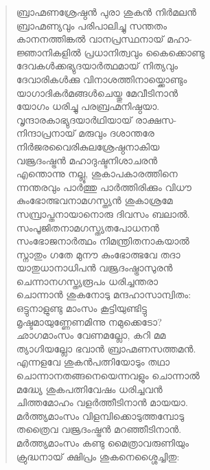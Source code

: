 \begin{verse}
ബ്രാഹ്മണശ്രേഷ്ഠന്‍ പുരാ ശുകന്‍ നിര്‍മലന്‍\\
ബ്രാഹ്മണ്യവും പരിപാലിച്ചു സന്തതം\\
കാനനത്തിങ്കല്‍ വാനപ്രസ്ഥനായ് മഹാ-\\
ജ്ഞാനികളില്‍ പ്രധാനിത്വവും കൈക്കൊണ്ടു\\
ദേവകള്‍ക്കഭ്യുദയാര്‍ത്ഥമായ് നിത്യവും\\
ദേവാരികള്‍ക്കു വിനാശത്തിനായ്ക്കൊണ്ടും\\
യാഗാദികര്‍മങ്ങള്‍ചെയ്തു മേവീടിനാന്‍\\
യോഗം ധരിച്ചു പരബ്രഹ്മനിഷ്ഠയാ.\\
വൃന്ദാരകാഭ്യുദയാര്‍ഥിയായ് രാക്ഷസ-\\
നിന്ദാപ്രനായ് മരുവും ദശാന്തരേ\\
നിര്‍ജരവൈരികുലശ്രേഷ്ഠനാകിയ\\
വജ്രദംഷ്ട്രന്‍ മഹാദുഷ്ടനിശാചരന്‍\\
എന്തൊന്നു നല്ലൂ, ശുകാപകാരത്തിനെ\\
ന്നന്തരവും പാര്‍ത്തു പാര്‍ത്തിരിക്കും വിധൗ\\
കുംഭോത്ഭവനാമഗസ്ത്യന്‍ ശുകാശ്രമേ\\
സമ്പ്രാപ്തനായാനൊരു ദിവസം ബലാല്‍.\\
സംപൂജിതനാമഗസ്ത്യതപോധനന്‍\\
സംഭോജനാര്‍ത്ഥം നിമന്ത്രിതനാകയാല്‍\\
സ്നാതും ഗതേ മുനൗ കുംഭോത്ഭവേ തദാ\\
യാതുധാനാധിപന്‍ വജ്രദംഷ്ട്രാസുരന്‍\\
ചെന്നാനഗസ്ത്യരൂപം ധരിച്ചന്തരാ\\
ചൊന്നാന്‍ ശുകനോടു മന്ദഹാസാന്വിതം:\\
ഒട്ടുനാളുണ്ടു മാംസം കൂട്ടിയുണ്ടിട്ടു\\
മൃഷ്ടമായുണ്ണേണമിന്നു നമുക്കെടോ?\\
ഛാഗമാംസം വേണമല്ലോ, കറി മമ\\
ത്യാഗിയല്ലോ ഭവാന്‍ ബ്രാഹ്മണസത്തമന്‍.\\
എന്നളവേ ശുകന്‍പത്നിയോടും തഥാ\\
ചൊന്നാനതങ്ങനെയെന്നവളും ചൊന്നാല്‍\\
മദ്ധ്യേ ശുകപത്നിവേഷം ധരിച്ചവന്‍\\
ചിത്തമോഹം വളര്‍ത്തീടിനാന്‍ മായയാ.\\
മര്‍ത്ത്യമാംസം വിളമ്പിക്കൊടുത്തമ്പോടു\\
തത്രൈവ വജ്രദംഷ്ട്രന്‍ മറഞ്ഞീടിനാന്‍.\\
മര്‍ത്ത്യമാംസം കണ്ടു മൈത്രാവരുണിയും\\
ക്രുദ്ധനായ് ക്ഷിപ്രം ശുകനെശ്ശൈച്ചിതു:\\

\end{verse}
